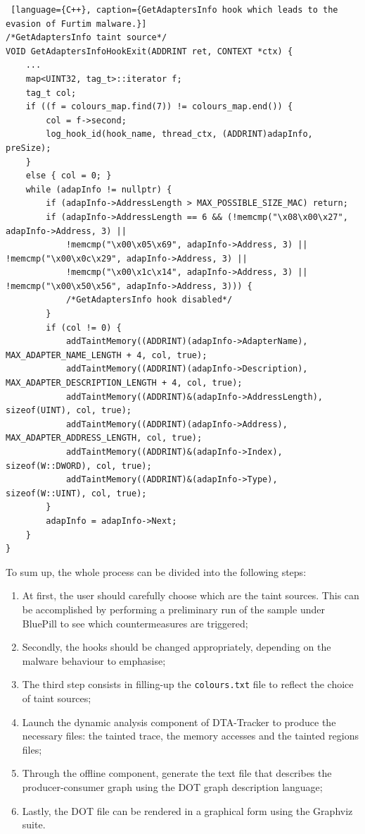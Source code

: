 \documentclass[LaM,binding=0.6cm]{sapthesis}
\begin{document}
\begin{lstlisting} [language={C++}, caption={GetAdaptersInfo hook which leads to the evasion of Furtim malware.}]
/*GetAdaptersInfo taint source*/
VOID GetAdaptersInfoHookExit(ADDRINT ret, CONTEXT *ctx) {
	...	
	map<UINT32, tag_t>::iterator f;
	tag_t col;
	if ((f = colours_map.find(7)) != colours_map.end()) {
		col = f->second;
		log_hook_id(hook_name, thread_ctx, (ADDRINT)adapInfo, preSize);
	}
	else { col = 0; }
	while (adapInfo != nullptr) {
		if (adapInfo->AddressLength > MAX_POSSIBLE_SIZE_MAC) return;
		if (adapInfo->AddressLength == 6 && (!memcmp("\x08\x00\x27", adapInfo->Address, 3) ||
			!memcmp("\x00\x05\x69", adapInfo->Address, 3) || !memcmp("\x00\x0c\x29", adapInfo->Address, 3) ||
			!memcmp("\x00\x1c\x14", adapInfo->Address, 3) || !memcmp("\x00\x50\x56", adapInfo->Address, 3))) {
			/*GetAdaptersInfo hook disabled*/
		}
		if (col != 0) {
			addTaintMemory((ADDRINT)(adapInfo->AdapterName), MAX_ADAPTER_NAME_LENGTH + 4, col, true);
			addTaintMemory((ADDRINT)(adapInfo->Description), MAX_ADAPTER_DESCRIPTION_LENGTH + 4, col, true);
			addTaintMemory((ADDRINT)&(adapInfo->AddressLength), sizeof(UINT), col, true);
			addTaintMemory((ADDRINT)(adapInfo->Address), MAX_ADAPTER_ADDRESS_LENGTH, col, true);
			addTaintMemory((ADDRINT)&(adapInfo->Index), sizeof(W::DWORD), col, true);
			addTaintMemory((ADDRINT)&(adapInfo->Type), sizeof(W::UINT), col, true);
		}
		adapInfo = adapInfo->Next;
	}
}
\end{lstlisting}
To sum up, the whole process can be divided into the following steps:
\begin{enumerate}
\item At first, the user should carefully choose which are the taint sources. This can be accomplished by performing a preliminary run of the sample under BluePill to see which countermeasures are triggered;
\item Secondly, the hooks should be changed appropriately, depending on the malware behaviour to emphasise;
\item The third step consists in filling-up the \texttt{colours.txt} file to reflect the choice of taint sources;
\item Launch the dynamic analysis component of DTA-Tracker to produce the necessary files: the tainted trace, the memory accesses and the tainted regions files;
\item Through the offline component, generate the text file that describes the producer-consumer graph using the DOT graph description language;
\item Lastly, the DOT file can be rendered in a graphical form using the Graphviz suite.
\end{enumerate}

\backmatter
\cleardoublepage
{}
{}
\end{document}
